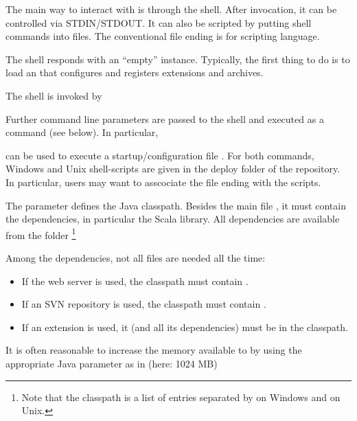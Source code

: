 The main way to interact with \mmt is through the shell.
After invocation, it can be controlled via STDIN/STDOUT.
It can also be scripted by putting shell commands into files. The conventional file ending is  for \mmt scripting language.

The \mmt shell responds with an ``empty'' \mmt instance.
Typically, the first thing to do is to load an  that configures \mmt and registers extensions and archives.

The shell is invoked by
\begin{center}
\end{center}
Further command line parameters are passed to the shell and executed as a command (see below). In particular,
\begin{center}
\end{center}
can be used to execute a startup/configuration file .
For both commands, Windows and Unix shell-scripts are given in the deploy folder of the \mmt repository.
In particular, users may want to asscociate the  file ending with the  scripts.

The  parameter defines the Java classpath. Besides the main file , it must contain the dependencies, in particular the Scala library. All dependencies are available from the folder  \footnote{Note that the classpath is a list of entries separated by \code{;} on Windows and \code{:} on Unix.}

Among the dependencies, not all files are needed all the time:
\begin{itemize}
\item If the {\mmt} web server is used, the classpath must contain  \cite{tiscaf}.
\item If an SVN repository is used, the classpath must contain .
\item If an {\mmt} extension is used, it (and all its dependencies) must be in the classpath.
\end{itemize}

It is often reasonable to increase the memory available to {\mmt} by using the appropriate Java parameter as in (here: 1024 MB) 
\begin{center}
\end{center}

